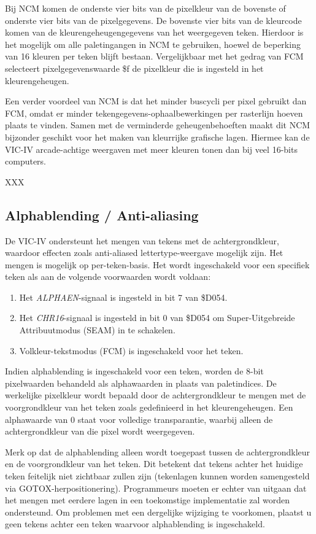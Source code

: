 Bij NCM komen de onderste vier bits van de pixelkleur van de bovenste of onderste vier bits van de pixelgegevens. De bovenste vier bits van de kleurcode komen van de kleurengeheugengegevens van het weergegeven teken. Hierdoor is het mogelijk om alle paletingangen in NCM te gebruiken, hoewel de beperking van 16 kleuren per teken blijft bestaan. Vergelijkbaar met het gedrag van FCM selecteert pixelgegevenswaarde \$f de pixelkleur die is ingesteld in het kleurengeheugen.

Een verder voordeel van NCM is dat het minder buscycli per pixel gebruikt dan FCM, omdat er minder tekengegevens-ophaalbewerkingen per rasterlijn hoeven plaats te vinden. Samen met de verminderde geheugenbehoeften maakt dit NCM bijzonder geschikt voor het maken van kleurrijke grafische lagen. Hiermee kan de VIC-IV arcade-achtige weergaven met meer kleuren tonen dan bij veel 16-bits computers.


XXX

\subsection{Alphablending / Anti-aliasing}

De VIC-IV ondersteunt het mengen van tekens met de achtergrondkleur, waardoor effecten zoals anti-aliased lettertype-weergave mogelijk zijn. Het mengen is mogelijk op per-teken-basis. Het wordt ingeschakeld voor een specifiek teken als aan de volgende voorwaarden wordt voldaan:
\begin{enumerate}
  \item Het {\em ALPHAEN}-signaal is ingesteld in bit 7 van \$D054.  \item Het {\em CHR16}-signaal is ingesteld in bit 0 van \$D054 om Super-Uitgebreide Attribuutmodus (SEAM) in te schakelen.  \item Volkleur-tekstmodus (FCM) is ingeschakeld voor het teken.
\end{enumerate}
Indien alphablending is ingeschakeld voor een teken, worden de 8-bit pixelwaarden behandeld als alphawaarden in plaats van paletindices. De werkelijke pixelkleur wordt bepaald door de achtergrondkleur te mengen met de voorgrondkleur van het teken zoals gedefinieerd in het kleurengeheugen. Een alphawaarde van 0 staat voor volledige transparantie, waarbij alleen de achtergrondkleur van die pixel wordt weergegeven.

Merk op dat de alphablending alleen wordt toegepast tussen de achtergrondkleur en de voorgrondkleur van het teken. Dit betekent dat tekens achter het huidige teken feitelijk niet zichtbaar zullen zijn (tekenlagen kunnen worden samengesteld via GOTOX-herpositionering). Programmeurs moeten er echter van uitgaan dat het mengen met eerdere lagen in een toekomstige implementatie zal worden ondersteund. Om problemen met een dergelijke wijziging te voorkomen, plaatst u geen tekens achter een teken waarvoor alphablending is ingeschakeld.



